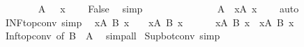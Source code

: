 \begin{isabellebody}
\ \ \ \ \ \ \isamarkupfalse%
\ {\isacartoucheopen}{\isasymSqinter}A\ {\isacharequal}{\kern0pt}\ {\isasymtop}{\isacartoucheclose}\ {\isacartoucheopen}x\ {\isasymnoteq}\ {\isasymtop}{\isacartoucheclose}\ \isamarkupfalse%
\ False\ \isamarkupfalse%
\ simp\isanewline
\ \ \ \ \isamarkupfalse%
\isanewline
\ \ \isamarkupfalse%
\isanewline
\ \ \isamarkupfalse%
\ \isamarkupfalse%
\ {\isachardoublequoteopen}{\isasymtop}\ {\isacharequal}{\kern0pt}\ {\isasymSqinter}A\ {\isasymlongleftrightarrow}\ {\isacharparenleft}{\kern0pt}{\isasymforall}x{\isasymin}A{\isachardot}{\kern0pt}\ x\ {\isacharequal}{\kern0pt}\ {\isasymtop}{\isacharparenright}{\kern0pt}{\isachardoublequoteclose}\ \isamarkupfalse%
\ auto\isanewline
{}\isamarkupfalse%
%
\endisatagproof
{\isafoldproof}%
%
\isadelimproof
\isanewline
%
\endisadelimproof
\isanewline
{}\isamarkupfalse%
\ INF{\isacharunderscore}{\kern0pt}top{\isacharunderscore}{\kern0pt}conv\ {\isacharbrackleft}{\kern0pt}simp{\isacharbrackright}{\kern0pt}{\isacharcolon}{\kern0pt}\isanewline
\ \ {\isachardoublequoteopen}{\isacharparenleft}{\kern0pt}{\isasymSqinter}x{\isasymin}A{\isachardot}{\kern0pt}\ B\ x{\isacharparenright}{\kern0pt}\ {\isacharequal}{\kern0pt}\ {\isasymtop}\ {\isasymlongleftrightarrow}\ {\isacharparenleft}{\kern0pt}{\isasymforall}x{\isasymin}A{\isachardot}{\kern0pt}\ B\ x\ {\isacharequal}{\kern0pt}\ {\isasymtop}{\isacharparenright}{\kern0pt}{\isachardoublequoteclose}\isanewline
\ \ {\isachardoublequoteopen}{\isasymtop}\ {\isacharequal}{\kern0pt}\ {\isacharparenleft}{\kern0pt}{\isasymSqinter}x{\isasymin}A{\isachardot}{\kern0pt}\ B\ x{\isacharparenright}{\kern0pt}\ {\isasymlongleftrightarrow}\ {\isacharparenleft}{\kern0pt}{\isasymforall}x{\isasymin}A{\isachardot}{\kern0pt}\ B\ x\ {\isacharequal}{\kern0pt}\ {\isasymtop}{\isacharparenright}{\kern0pt}{\isachardoublequoteclose}\isanewline
%
\isadelimproof
\ \ %
\endisadelimproof
%
\isatagproof
{}\isamarkupfalse%
\ Inf{\isacharunderscore}{\kern0pt}top{\isacharunderscore}{\kern0pt}conv\ {\isacharbrackleft}{\kern0pt}of\ {\isachardoublequoteopen}B\ {\isacharbackquote}{\kern0pt}\ A{\isachardoublequoteclose}{\isacharbrackright}{\kern0pt}\ \isamarkupfalse%
\ simp{\isacharunderscore}{\kern0pt}all%
\endisatagproof
{\isafoldproof}%
%
\isadelimproof
\isanewline
%
\endisadelimproof
\isanewline
{}\isamarkupfalse%
\ Sup{\isacharunderscore}{\kern0pt}bot{\isacharunderscore}{\kern0pt}conv\ {\isacharbrackleft}{\kern0pt}simp{\isacharbrackright}{\kern0pt}{\isacharcolon}{\kern0pt}\isanewline

\end{isabellebody}
